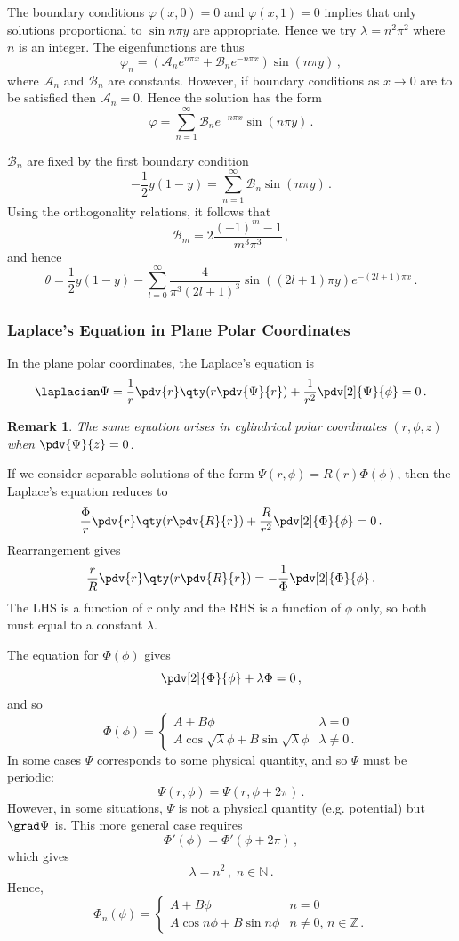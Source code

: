 \documentclass{article}
\theoremstyle{plain}\theoremheaderfont{\normalfont\itshape}\theorembodyfont{\rmfamily}\theoremseparator{.}\newtheorem*{rem}{Remark}\newtheorem*{ex}{Example}\newtheorem*{proof}{Proof}\newtheorem*{altp}{Alternative proof}
\theoremstyle{plain}\theoremheaderfont{\normalfont\bfseries}\theorembodyfont{\rmfamily}\theoremseparator{.}\newtheorem{thm}{Theorem}[section]\newtheorem{lem}[thm]{Lemma}\newtheorem{prop}[thm]{Proposition}\newtheorem*{cor}{Corollary}\newtheorem{defn}[thm]{Definition}\newtheorem{clm}[thm]{Claim}\newtheorem{clminproof}{Claim}
\theoremstyle{break}\theoremheaderfont{\normalfont\itshape}\theorembodyfont{\rmfamily}\theoremseparator{.\medskip}\newtheorem*{proofskip}{Proof}\newtheorem*{exs}{Examples}\newtheorem*{rems}{Remarks}
\theoremstyle{break}\theoremheaderfont{\normalfont\bfseries}\theorembodyfont{\rmfamily}\theoremseparator{.\medskip}\newtheorem{lemskip}[thm]{Lemma}\newtheorem{defnskip}[thm]{Definition}\newtheorem{propskip}[thm]{Proposition}\newtheorem{thmskip}[thm]{Theorem}
\numberwithin{equation}{section}
\begin{document}
	The boundary conditions \(\varphi(x,0)=0\) and \(\varphi(x,1)=0\) implies that only solutions proportional to \(\sin n\pi y\) are appropriate. Hence we try \(\lambda=n^2\pi^2\) where \(n\) is an integer. The eigenfunctions are thus
	\[\varphi_n=(\mathcal{A}_n e^{n\pi x}+\mathcal{B}_n e^{-n\pi x})\sin(n\pi y)\,,\]
	where \(\mathcal{A}_n\) and \(\mathcal{B}_n\) are constants. However, if boundary conditions as \(x\to 0\) are to be satisfied then \(\mathcal{A}_n=0\). Hence the solution has the form
	\[\varphi=\sum_{n=1}^{\infty}\mathcal{B}_n e^{-n\pi x}\sin(n\pi y)\,.\]
	
	\(\mathcal{B}_n\) are fixed by the first boundary condition
	\[-\frac{1}{2}y(1-y)=\sum_{n=1}^{\infty}\mathcal{B}_n\sin(n\pi y)\,.\]
	Using the orthogonality relations, it follows that
	\[\mathcal{B}_m=2\frac{(-1)^m-1}{m^3\pi^3}\,,\]
	and hence
	\[\theta=\frac{1}{2}y(1-y)-\sum_{l=0}^{\infty}\frac{4}{\pi^3(2l+1)^3}\sin((2l+1)\pi y)e^{-(2l+1)\pi x}\,.\]
	\subsubsection{Laplace's Equation in Plane Polar Coordinates}
	In the plane polar coordinates, the Laplace's equation is
	\[\laplacian\Psi=\frac{1}{r}\pdv{r}\qty(r\pdv{\Psi}{r})+\frac{1}{r^2}\pdv[2]{\Psi}{\phi}=0\,.\]
	\begin{rem}
		The same equation arises in cylindrical polar coordinates \((r,\phi,z)\) when \(\pdv{\Psi}{z}=0\).
	\end{rem}

	If we consider separable solutions of the form \(\Psi(r,\phi)=R(r)\Phi(\phi)\), then the Laplace's equation reduces to
	\[\frac{\Phi}{r}\pdv{r}\qty(r\pdv{R}{r})+\frac{R}{r^2}\pdv[2]{\Phi}{\phi}=0\,.\]
	Rearrangement gives
	\[\frac{r}{R}\pdv{r}\qty(r\pdv{R}{r})=-\frac{1}{\Phi}\pdv[2]{\Phi}{\phi}\,.\]
	The LHS is a function of \(r\) only and the RHS is a function of \(\phi\) only, so both must equal to a constant \(\lambda\).

	The equation for \(\Phi(\phi)\) gives
	\[\pdv[2]{\Phi}{\phi}+\lambda\Phi=0\,,\]
	and so
	\[\Phi(\phi)=\begin{cases}
		A+B\phi & \lambda=0\\
		A\cos\sqrt{\lambda}\phi+B\sin\sqrt{\lambda}\phi & \lambda\ne 0\,.
	\end{cases}\]
	In some cases \(\Psi\) corresponds to some physical quantity, and so \(\Psi\) must be periodic:
	\[\Psi(r,\phi)=\Psi(r,\phi+2\pi)\,.\]
	However, in some situations, \(\Psi\) is not a physical quantity (e.g. potential) but \(\grad\Psi\) is. This more general case requires
	\[\Phi'(\phi)=\Phi'(\phi+2\pi)\,,\]
	which gives
	\[\lambda=n^2\,,\;n\in\mathbb{N}\,.\]
	Hence,
	\[\Phi_n(\phi)=\begin{cases}
		A+B\phi & n=0\\
		A\cos n\phi+B\sin n\phi & n\ne 0,\, n\in\mathbb{Z}\,.
	\end{cases}\]
\end{document}
